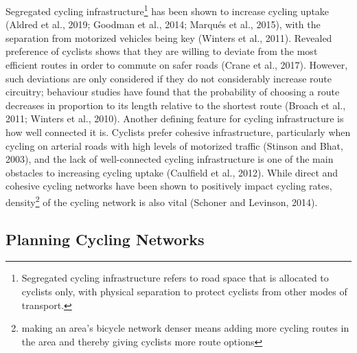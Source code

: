 \documentclass[
]{article}
\begin{document}
Segregated cycling
infrastructure\footnote{Segregated cycling infrastructure refers to road space that is allocated to cyclists only, with physical separation to protect cyclists from other modes of transport.}
has been shown to increase cycling uptake (Aldred et al., 2019; Goodman
et al., 2014; Marqués et al., 2015), with the separation from motorized
vehicles being key (Winters et al., 2011). Revealed preference of
cyclists shows that they are willing to deviate from the most efficient
routes in order to commute on safer roads (Crane et al., 2017). However,
such deviations are only considered if they do not considerably increase
route circuitry; behaviour studies have found that the probability of
choosing a route decreases in proportion to its length relative to the
shortest route (Broach et al., 2011; Winters et al., 2010). Another
defining feature for cycling infrastructure is how well connected it is.
Cyclists prefer cohesive infrastructure, particularly when cycling on
arterial roads with high levels of motorized traffic (Stinson and Bhat,
2003), and the lack of well-connected cycling infrastructure is one of
the main obstacles to increasing cycling uptake (Caulfield et al.,
2012). While direct and cohesive cycling networks have been shown to
positively impact cycling rates,
density\footnote{making an area's bicycle network denser means adding more cycling routes in the area and thereby giving cyclists more route options}
of the cycling network is also vital (Schoner and Levinson, 2014).

\hypertarget{planning-cycling-networks}{%
\subsection{Planning Cycling Networks}\label{planning-cycling-networks}}
\end{document}
